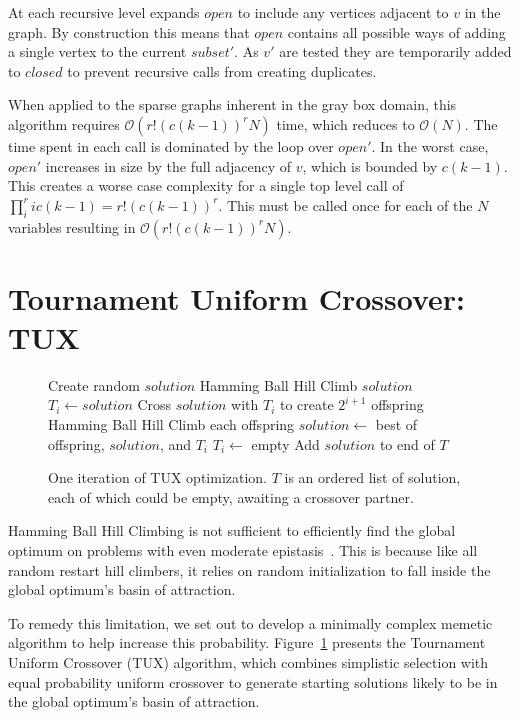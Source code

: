 \documentclass{sig-alternate}
\newcommand{\BigO}[1]{$\mathcal{O}{(#1)}$}
\begin{document}
At each recursive level  expands $open$ to include any vertices
adjacent to $v$ in the graph. By construction this means that $open$ contains
all possible ways of adding a single vertex to the current $subset'$. As $v'$
are tested they are temporarily added to $closed$ to prevent recursive calls
from creating duplicates.

When applied to the sparse graphs inherent in the gray box domain, this algorithm
requires \BigO{r!(c(k-1))^rN} time, which reduces to \BigO{N}. The time spent
in each call is dominated by the loop over $open'$. In the worst case, $open'$
increases in size by the full adjacency of $v$, which is bounded by $c(k-1)$.
This creates a worse case complexity for a single top level call of
$\prod_{i}^{r} ic(k-1) = r!(c(k-1))^r$. This must be called once for each
of the $N$ variables resulting in \BigO{r!(c(k-1))^rN}.

\section{Tournament Uniform Crossover: TUX}
\begin{figure}
  \begin{algorithmic}[1]
    \State Create random $solution$
    \State Hamming Ball Hill Climb $solution$
        \State $T_i \leftarrow solution$
        \State \Return
      \EndIf
      \State Cross $solution$ with $T_i$ to create $2^{i+1}$ offspring
      \State Hamming Ball Hill Climb each offspring
      \State $solution \leftarrow$ best of offspring, $solution$, and $T_i$
      \State $T_i \leftarrow$ empty
    \EndFor
    \State Add $solution$ to end of $T$
  \EndProcedure
\end{algorithmic}
  \caption{One iteration of TUX optimization. $T$ is an
           ordered list of solution, each of which could be empty,
           awaiting a crossover partner.}
  \label{fig-TUX}
\end{figure}

Hamming Ball Hill Climbing is not sufficient to efficiently find the global optimum
on problems with even moderate epistasis~\cite{chicano:2014:ball}. This is because
like all random restart hill climbers, it relies on random initialization to fall
inside the global optimum's basin of attraction.

To remedy this limitation, we set out to develop a minimally complex memetic
algorithm to help increase this probability. Figure~\ref{fig-TUX} presents
the Tournament Uniform Crossover (TUX) algorithm, which combines simplistic
selection with equal probability uniform crossover to generate starting
solutions likely to be in the global optimum's basin of attraction.
\end{document}
